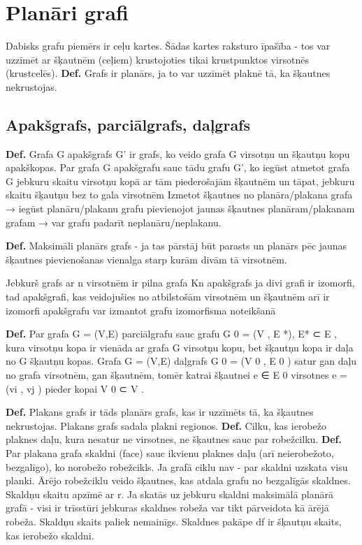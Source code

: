 \documentclass{article}
\begin{document}
\section{Planāri grafi}
Dabisks grafu piemērs ir ceļu kartes. Šādas kartes raksturo īpašība - tos var uzzīmēt ar šķautnēm (ceļiem) krustojoties tikai krustpunktos virsotnēs (krustcelēs).
\textbf{Def.}  Grafs ir planārs, ja to var uzzīmēt plaknē tā, ka šķautnes nekrustojas.  

\subsection{Apakšgrafs, parciālgrafs, daļgrafs}
\textbf{Def.}  Grafa G apakšgrafs G' ir grafs, ko veido grafa G virsotņu un šķautņu kopu apakškopas.  Par grafa G apakšgrafu sauc tādu grafu G', ko iegūst atmetot grafa G jebkuru skaitu virsotņu kopā ar tām piederošajām šķautnēm un tāpat, jebkuru skaitu šķautņu bez to gala virsotnēm
Izmetot šķautnes no planāra/plakana grafa → iegūst planāru/plakanu grafu pievienojot jaunas šķautnes planāram/plakanam grafam → var grafu padarīt neplanāru/neplakanu.

\textbf{Def.}  Maksimāli planārs grafs - ja tas pārstāj būt parasts un planārs pēc jaunas šķautnes pievienošanas vienalga starp kurām divām tā virsotnēm.

Jebkurš grafs ar n virsotnēm ir pilna grafa Kn apakšgrafs ja divi grafi ir izomorfi, tad apakšgrafi, kas veidojušies no atbilstošām virsotnēm un šķautnēm arī ir izomorfi apakšgrafu var izmantot grafu izomorfisma noteikšanā

\textbf{Def.} Par grafa G = (V,E) parciālgrafu sauc grafu G 0 = (V , E *), E* ⊂ E , kura virsotņu kopa ir vienāda ar grafa G virsotņu kopu, bet šķautņu kopa ir daļa no G šķautņu kopas.  Grafa G = (V,E) daļgrafs G 0 = (V 0 , E 0 ) satur gan daļu no grafa virsotnēm, gan šķautnēm, tomēr katrai šķautnei e ∈ E 0 virsotnes e = (vi , vj ) pieder kopai V 0 ⊂ V .

\textbf{Def.} Plakans grafs ir tāds planārs grafs, kas ir uzzīmēts tā, ka šķautnes nekrustojas.  Plakans grafs sadala plakni regionos.
\textbf{Def.}  Cilku, kas ierobežo plaknes daļu, kura nesatur ne virsotnes, ne šķautnes sauc par robežcilku.
\textbf{Def.} Par plakana grafa skaldni (face) sauc ikvienu plaknes daļu (arī neierobežoto, bezgalīgo), ko norobežo robežcikls.  Ja grafā ciklu nav - par skaldni uzskata visu planki.  Ārējo robežciklu veido šķautnes, kas atdala grafu no bezgalīgās skaldnes.  Skaldņu skaitu apzīmē ar r. Ja skatās uz jebkuru skaldni maksimālā planārā grafā - visi ir trīsstūri jebkuras skaldnes robeža var tikt pārveidota kā ārējā robeža. Skaldņu skaits paliek nemainīgs.  Skaldnes pakāpe df ir šķautņu skaits, kas ierobežo skaldni.
\end{document}

